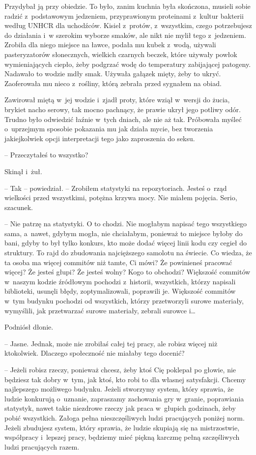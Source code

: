 \documentclass[oneside,polish,11pt,sfheadings]{mwbk}
\begin{document}
Przydybał ją przy obiedzie. To było, zanim kuchnia była skończona,
musieli sobie radzić z~podstawowym jedzeniem, przyprawionym proteinami z~kultur bakterii według UNHCR dla uchodźców. Kisiel z~protów, z~wszystkim, czego potrzebujesz do działania i~w szerokim wyborze smaków,
ale nikt nie mylił tego z~jedzeniem. Zrobiła dla niego miejsce na ławce,
podała mu kubek z~wodą, używali pasteryzatorów słonecznych, wielkich
czarnych beczek, które używały powłok wymieniających ciepło, żeby
podgrzać wodę do temperatury zabijającej patogeny. Nadawało to wodzie
mdły smak. Używała gałązek mięty, żeby to ukryć. Zaoferowała mu nieco z~rośliny, którą zebrała przed sygnałem na obiad.

Zawirował miętą w~jej wodzie i~zjadł proty, które wziął w~wersji do
żucia, brykiet nacho serowy, tak mocno pachnący, że prawie ukrył jego
potliwy odór. Trudno było odwiedzić łaźnie w~tych dniach, ale nie aż
tak. Próbowała myśleć o~uprzejmym sposobie pokazania mu jak działa
mycie, bez tworzenia jakiejkolwiek opcji interpretacji tego jako
zaproszenia do seksu.

-- Przeczytałeś to wszystko?

Skinął i~żuł. 

-- Tak -- powiedział. -- Zrobiłem statystyki na
repozytoriach. Jesteś o~rząd wielkości przed wszystkimi, potężna krzywa
mocy. Nie miałem pojęcia. Serio, szacunek.

-- Nie patrzę na statystyki. O to chodzi. Nie mogłabym napisać tego
wszystkiego sama, a~nawet, gdybym mogła, nie chciałabym, ponieważ to
miejsce byłoby do bani, gdyby to był tylko konkurs, kto może dodać
więcej linii kodu czy cegieł do struktury. To rajd do zbudowania
najcięższego samolotu na świecie. Co wiedza, że ta osoba ma więcej
commitów niż tamte, Ci mówi? Że powinieneś pracować więcej? Że jesteś
głupi? Że jesteś wolny? Kogo to obchodzi? Większość commitów w~naszym
kodzie źródłowym pochodzi z~historii, wszystkich, którzy napisali
biblioteki, usunęli błędy, zoptymalizowali, poprawili je. Większość
commitów w~tym budynku pochodzi od wszystkich, którzy przetworzyli
surowe materiały, wymyślili, jak przetwarzać surowe materiały, zebrali
surowce i\ldots 

Podniósł dłonie. 

-- Jasne. Jednak, może nie zrobiłaś całej tej pracy, ale
robisz więcej niż ktokolwiek. Dlaczego społeczność nie miałaby tego
docenić?

-- Jeżeli robisz rzeczy, ponieważ chcesz, żeby ktoś Cię poklepał po
głowie, nie będziesz tak dobry w~tym, jak ktoś, kto robi to dla własnej
satysfakcji. Chcemy najlepszego możliwego budynku. Jeżeli stworzymy
system, który sprawia, że ludzie konkurują o~uznanie, zapraszamy
zachowania gry w~granie, poprawiania statystyk, nawet takie niezdrowe
rzeczy jak praca w~głupich godzinach, żeby pobić wszystkich. Załoga
pełna nieszczęśliwych ludzi pracujących poniżej norm. Jeżeli zbudujesz
system, który sprawia, że ludzie skupiają się na mistrzostwie,
współpracy i~lepszej pracy, będziemy mieć piękną karczmę pełną
szczęśliwych ludzi pracujących razem.
\end{document}
